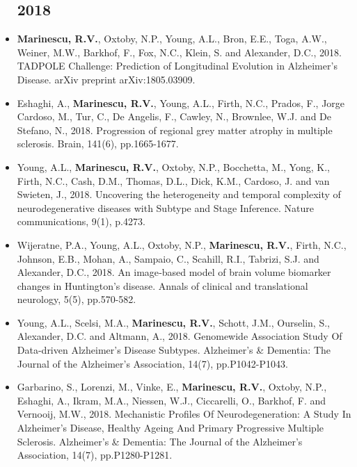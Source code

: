\documentclass[a4paper,10pt]{article} %
\begin{document}
\begin{itemize}
\subsection*{2018}
\item[\journal] \textbf{Marinescu, R.V.}, Oxtoby, N.P., Young, A.L., Bron, E.E., Toga, A.W., Weiner, M.W., Barkhof, F., Fox, N.C., Klein, S. and Alexander, D.C., 2018. TADPOLE Challenge: Prediction of Longitudinal Evolution in Alzheimer's Disease. arXiv preprint arXiv:1805.03909.
\item[\journal] Eshaghi, A., \textbf{Marinescu, R.V.}, Young, A.L., Firth, N.C., Prados, F., Jorge Cardoso, M., Tur, C., De Angelis, F., Cawley, N., Brownlee, W.J. and De Stefano, N., 2018. Progression of regional grey matter atrophy in multiple sclerosis. Brain, 141(6), pp.1665-1677.
\item[\journal] Young, A.L., \textbf{Marinescu, R.V.}, Oxtoby, N.P., Bocchetta, M., Yong, K., Firth, N.C., Cash, D.M., Thomas, D.L., Dick, K.M., Cardoso, J. and van Swieten, J., 2018. Uncovering the heterogeneity and temporal complexity of neurodegenerative diseases with Subtype and Stage Inference. Nature communications, 9(1), p.4273.
\item[\journal] Wijeratne, P.A., Young, A.L., Oxtoby, N.P., \textbf{Marinescu, R.V.}, Firth, N.C., Johnson, E.B., Mohan, A., Sampaio, C., Scahill, R.I., Tabrizi, S.J. and Alexander, D.C., 2018. An image‐based model of brain volume biomarker changes in Huntington's disease. Annals of clinical and translational neurology, 5(5), pp.570-582.
\item[\poster] Young, A.L., Scelsi, M.A., \textbf{Marinescu, R.V.}, Schott, J.M., Ourselin, S., Alexander, D.C. and Altmann, A., 2018. Genomewide Association Study Of Data-driven Alzheimer's Disease Subtypes. Alzheimer's \& Dementia: The Journal of the Alzheimer's Association, 14(7), pp.P1042-P1043.
\item[\poster] Garbarino, S., Lorenzi, M., Vinke, E., \textbf{Marinescu, R.V.}, Oxtoby, N.P., Eshaghi, A., Ikram, M.A., Niessen, W.J., Ciccarelli, O., Barkhof, F. and Vernooij, M.W., 2018. Mechanistic Profiles Of Neurodegeneration: A Study In Alzheimer’s Disease, Healthy Ageing And Primary Progressive Multiple Sclerosis. Alzheimer's \& Dementia: The Journal of the Alzheimer's Association, 14(7), pp.P1280-P1281.


\end{itemize}
\end{document}

